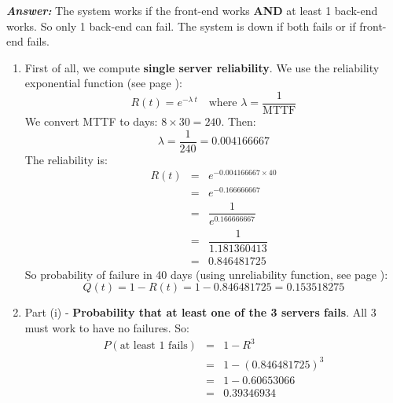 \begin{enumerate}
    \emph{\textcolor{Green3}{\textbf{Answer:}}} The system works if the front-end works \textbf{AND} at least 1 back-end works. So only 1 back-end can fail. The system is down if both fails or if front-end fails.
    \begin{enumerate}
        \item First of all, we compute \textbf{single server reliability}. We use the reliability exponential function (see page \pageref{eq: failure rate}):
        \begin{equation*}
            R(t) = e^{-\lambda \: t} \quad \text{where } \lambda = \dfrac{1}{\text{MTTF}}
        \end{equation*}
        We convert MTTF to days: $8 \times 30 = 240$. Then:
        \begin{equation*}
            \lambda = \dfrac{1}{240} = 0.004166667
        \end{equation*}
        The reliability is:
        \begin{equation*}
            \begin{array}{rcl}
                R(t) &=& e^{- 0.004166667 \times 40} \\ [.3em]
                &=& e^{-0.166666667} \\ [.3em]
                &=& \dfrac{1}{e^{0.166666667}} \\ [1em]
                &=& \dfrac{1}{1.181360413} \\ [1em]
                &=& 0.846481725
            \end{array}
        \end{equation*}
        So probability of failure in 40 days (using unreliability function, see page \pageref{eq: unreliability}):
        \begin{equation*}
            Q(t) = 1 - R(t) = 1 - 0.846481725 = 0.153518275
        \end{equation*}

        \item Part (i) - \textbf{Probability that at least one of the 3 servers fails}. All 3 must work to have no failures. So:
        \begin{equation*}
            \begin{array}{rcl}
                P(\text{at least 1 fails}) &=& 1 - R^3 \\ [.3em]
                &=& 1 - \left(0.846481725\right)^3 \\ [.3em]
                &=& 1 - 0.60653066 \\ [.3em]
                &=& \mathbf{0.3934}6934
            \end{array}
        \end{equation*}


\end{enumerate}
\end{enumerate}
